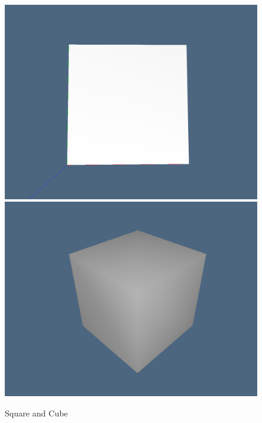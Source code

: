 \documentclass{article}
\begin{document}
\begin{figure}[h!]
\centering
\includegraphics[scale=0.5]{quadrato.jpg}
\includegraphics[scale=0.5]{cubo.jpg}
\caption{Square and Cube}
\end{figure}
\newpage
\end{document}

